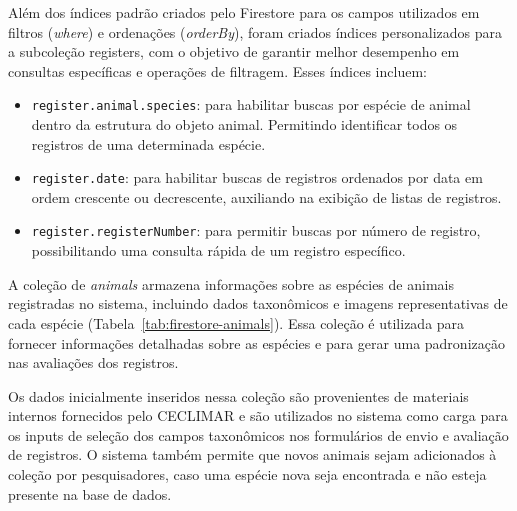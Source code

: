 Além dos índices padrão criados pelo Firestore para os 
campos utilizados em filtros (\textit{where}) e ordenações (\textit{orderBy}),
foram criados índices personalizados para a subcoleção registers, com o 
objetivo de garantir melhor desempenho em consultas específicas e operações 
de filtragem. Esses índices incluem:

\begin{itemize}
    \item \texttt{register.animal.species}: para habilitar buscas por espécie de animal dentro da 
    estrutura do objeto animal. Permitindo identificar todos os registros de uma determinada
    espécie.
    \item \texttt{register.date}: para habilitar buscas de registros ordenados por data em ordem 
    crescente ou decrescente, auxiliando na exibição de listas de registros.
    \item \texttt{register.registerNumber}: para permitir buscas por número de registro, possibilitando 
    uma consulta rápida de um registro específico.
\end{itemize}

A coleção de \textit{animals} armazena informações sobre as espécies de animais
registradas no sistema, incluindo dados taxonômicos e imagens representativas de cada espécie (Tabela~\ref{tab:firestore-animals}).
Essa coleção é utilizada para fornecer informações detalhadas sobre as espécies
e para gerar uma padronização nas avaliações dos registros.

Os dados inicialmente inseridos nessa coleção são provenientes de materiais internos fornecidos
pelo CECLIMAR e são utilizados no sistema como carga para os inputs de seleção 
dos campos taxonômicos nos formulários de envio e avaliação de registros.
O sistema também permite que novos animais sejam adicionados à coleção
por pesquisadores, caso uma espécie nova seja encontrada e não esteja presente
na base de dados. 

